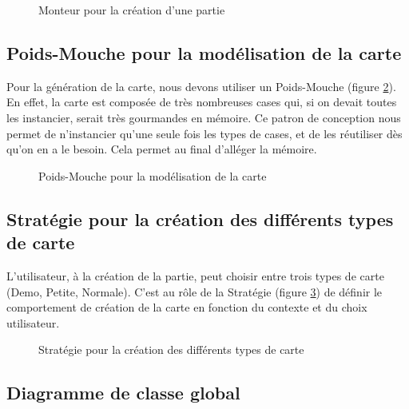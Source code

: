 \documentclass[a4paper]{article}
\begin{document}
\begin{figure}[!h] 
  \begin{center}
    \caption{Monteur pour la création d’une partie} 
    \label{monteur} 
  \end{center}
\end{figure}

\subsection{Poids-Mouche pour la modélisation de la carte}

Pour la génération de la carte, nous devons utiliser un Poids-Mouche (figure \ref{poidsMouche}). En effet, la carte est composée de très nombreuses cases qui, si on devait toutes les instancier, serait  très gourmandes en mémoire. Ce patron de conception nous permet de n’instancier qu’une seule fois les types de cases, et de les réutiliser dès qu’on en a le besoin. Cela permet au final d’alléger la mémoire.

\begin{figure}[!h] 
  \begin{center}
    \caption{Poids-Mouche pour la modélisation de la carte} 
    \label{poidsMouche} 
  \end{center}
\end{figure}

\subsection{Stratégie pour la création des différents types de carte}

L’utilisateur, à la création de la partie, peut choisir entre trois types de carte (Demo, Petite, Normale). C’est au rôle de la Stratégie (figure \ref{strategie}) de définir le comportement de création de la carte en fonction du contexte et du choix utilisateur.

\begin{figure}[!h] 
  \begin{center}
    \caption{Stratégie pour la création des différents types de carte} 
    \label{strategie} 
  \end{center}
\end{figure}

\subsection{Diagramme de classe global}
\end{document}
